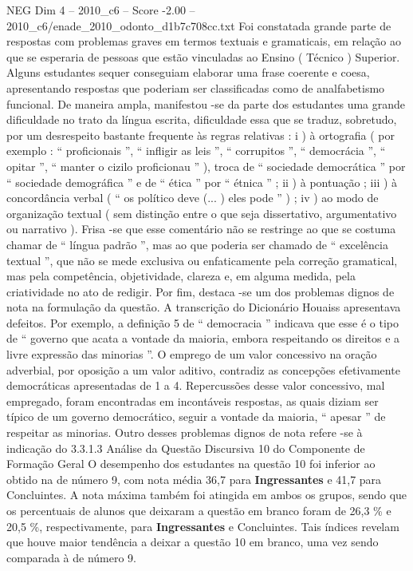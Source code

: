 \begin{textsample}{NEG Dim 4 – 2010\_c6 – Score -2.00 – 2010\_c6/enade\_2010\_odonto\_d1b7c708cc.txt}
Foi constatada grande parte de respostas com problemas graves em termos textuais e gramaticais, em relação ao que se esperaria de pessoas que estão vinculadas ao Ensino ( Técnico ) Superior.
Alguns estudantes sequer conseguiam elaborar uma frase coerente e coesa, apresentando respostas que poderiam ser classificadas como de analfabetismo funcional.
De maneira ampla, manifestou -se da parte dos estudantes uma grande dificuldade no trato da língua escrita, dificuldade essa que se traduz, sobretudo, por um desrespeito bastante frequente às regras relativas : i ) à ortografia ( por exemplo : “ proficionais ”, “ infligir as leis ”, “ corrupitos ”, “ democrácia ”, “ opitar ”, “ manter o cizilo proficionau ” ), troca de “ sociedade democrática ” por “ sociedade demográfica ” e de “ ética ” por “ étnica ” ; ii ) à pontuação ; iii ) à concordância verbal ( “ os político deve (... ) eles pode ” ) ; iv ) ao modo de organização textual ( sem distinção entre o que seja dissertativo, argumentativo ou narrativo ).
Frisa -se que esse comentário não se restringe ao que se costuma chamar de “ língua padrão ”, mas ao que poderia ser chamado de “ excelência textual ”, que não se mede exclusiva ou enfaticamente pela correção gramatical, mas pela competência, objetividade, clareza e, em alguma medida, pela criatividade no ato de redigir.
Por fim, destaca -se um dos problemas dignos de nota na formulação da questão.
A transcrição do Dicionário Houaiss apresentava defeitos.
Por exemplo, a definição 5 de “ democracia ” indicava que esse é o tipo de “ governo que acata a vontade da maioria, embora respeitando os direitos e a livre expressão das minorias ”.
O emprego de um valor concessivo na oração adverbial, por oposição a um valor aditivo, contradiz as concepções efetivamente democráticas apresentadas de 1 a 4.
Repercussões desse valor concessivo, mal empregado, foram encontradas em incontáveis respostas, as quais diziam ser típico de um governo democrático, seguir a vontade da maioria, “ apesar ” de respeitar as minorias.
Outro desses problemas dignos de nota refere -se à indicação do 3.3.1.3 Análise da Questão Discursiva 10 do Componente de Formação Geral O desempenho dos estudantes na questão 10 foi inferior ao obtido na de número 9, com nota média 36,7 para \textbf{Ingressantes} e 41,7 para Concluintes.
A nota máxima também foi atingida em ambos os grupos, sendo que os percentuais de alunos que deixaram a questão em branco foram de 26,3 \% e 20,5 \%, respectivamente, para \textbf{Ingressantes} e Concluintes.
Tais índices revelam que houve maior tendência a deixar a questão 10 em branco, uma vez sendo comparada à de número 9.

\end{textsample}
